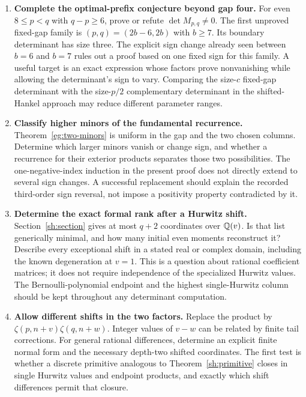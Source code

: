\begin{enumerate}[label=\textbf{Q\arabic*.},ref=Q\arabic*,itemsep=10pt]
\item \textbf{Complete the optimal-prefix conjecture beyond gap four.}
For even $8\le p<q$ with $q-p\ge6$, prove or refute
$\det M_{p,q}\ne0$. The first unproved fixed-gap family is
$(p,q)=(2b-6,2b)$ with $b\ge7$. Its boundary determinant has size
three. The explicit sign change already seen between $b=6$ and $b=7$
rules out a proof based on one fixed sign for this family. A useful
target is an exact expression whose factors prove nonvanishing while
allowing the determinant's sign to vary. Comparing the size-$c$
fixed-gap determinant with the size-$p/2$ complementary determinant
in the shifted-Hankel approach may reduce different parameter ranges.

\item \textbf{Classify higher minors of the fundamental recurrence.}
Theorem~\ref{eg:two-minors} is uniform in the gap and the two chosen
columns. Determine which larger minors vanish or change sign, and
whether a recurrence for their exterior products separates those two
possibilities. The one-negative-index induction in the present proof
does not directly extend to several sign changes. A successful
replacement should explain the recorded third-order sign reversal,
not impose a positivity property contradicted by it.

\item \textbf{Determine the exact formal rank after a Hurwitz shift.}
Section~\ref{sh:section} gives at most $q+2$ coordinates over
$\mathbb Q(v)$. Is that list generically minimal, and how many initial
even moments reconstruct it? Describe every exceptional shift in a
stated real or complex domain, including the known degeneration at
$v=1$. This is a question about rational coefficient matrices; it
does not require independence of the specialized Hurwitz values.
The Bernoulli-polynomial endpoint and the highest single-Hurwitz
column should be kept throughout any determinant computation.

\item \textbf{Allow different shifts in the two factors.}
Replace the product by
$\zeta(p,n+v)\zeta(q,n+w)$. Integer values of $v-w$ can be
related by finite tail corrections. For general rational differences,
determine an explicit finite normal form and the necessary depth-two
shifted coordinates. The first test is whether a discrete primitive
analogous to Theorem~\ref{sh:primitive} closes in single Hurwitz
values and endpoint products, and exactly which shift differences
permit that closure.


\end{enumerate}
